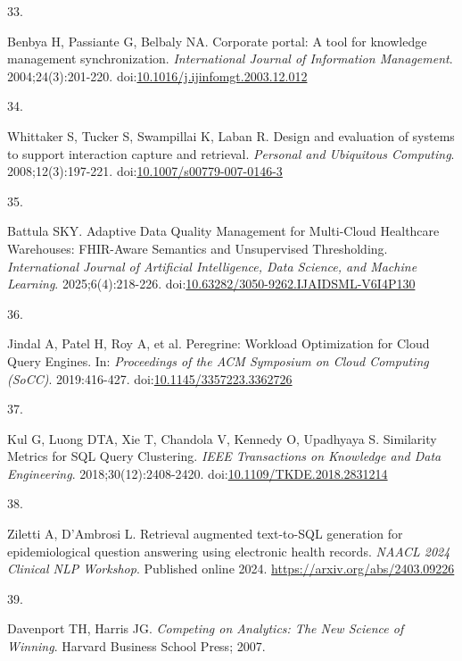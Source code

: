 \documentclass[
  american,
  11pt,
  letterpaper,
  oneside  ,captions=tableheading
]{scrartcl}
\newlength{\cslhangindent}
\newlength{\csllabelwidth}
\newenvironment{CSLReferences}[2] %
 {\begin{list}{}{%
  \setlength{\itemindent}{0pt}
  \setlength{\leftmargin}{0pt}
  \setlength{\parsep}{0pt}
  \ifodd #1
   \setlength{\leftmargin}{\cslhangindent}
   \setlength{\itemindent}{-1\cslhangindent}
  \fi
  \setlength{\itemsep}{#2\baselineskip}}}
 {\end{list}}
\newcommand{\CSLLeftMargin}[1]{\parbox[t]{\csllabelwidth}{\strut#1\strut}}
\newcommand{\CSLRightInline}[1]{\parbox[t]{\linewidth - \csllabelwidth}{\strut#1\strut}}
\begin{document}
\begin{CSLReferences}{0}{1}
\CSLLeftMargin{33. }%
\CSLRightInline{Benbya H, Passiante G, Belbaly NA. {Corporate portal: A
tool for knowledge management synchronization}. \emph{International
Journal of Information Management}. 2004;24(3):201-220.
doi:\href{https://doi.org/10.1016/j.ijinfomgt.2003.12.012}{10.1016/j.ijinfomgt.2003.12.012}}

\CSLLeftMargin{34. }%
\CSLRightInline{Whittaker S, Tucker S, Swampillai K, Laban R. Design and
evaluation of systems to support interaction capture and retrieval.
\emph{Personal and Ubiquitous Computing}. 2008;12(3):197-221.
doi:\href{https://doi.org/10.1007/s00779-007-0146-3}{10.1007/s00779-007-0146-3}}

\CSLLeftMargin{35. }%
\CSLRightInline{Battula SKY. {Adaptive Data Quality Management for
Multi-Cloud Healthcare Warehouses: FHIR-Aware Semantics and Unsupervised
Thresholding}. \emph{International Journal of Artificial Intelligence,
Data Science, and Machine Learning}. 2025;6(4):218-226.
doi:\href{https://doi.org/10.63282/3050-9262.IJAIDSML-V6I4P130}{10.63282/3050-9262.IJAIDSML-V6I4P130}}

\CSLLeftMargin{36. }%
\CSLRightInline{Jindal A, Patel H, Roy A, et al. {Peregrine: Workload
Optimization for Cloud Query Engines}. In: \emph{Proceedings of the ACM
Symposium on Cloud Computing (SoCC)}. 2019:416-427.
doi:\href{https://doi.org/10.1145/3357223.3362726}{10.1145/3357223.3362726}}

\CSLLeftMargin{37. }%
\CSLRightInline{Kul G, Luong DTA, Xie T, Chandola V, Kennedy O,
Upadhyaya S. {Similarity Metrics for SQL Query Clustering}. \emph{IEEE
Transactions on Knowledge and Data Engineering}. 2018;30(12):2408-2420.
doi:\href{https://doi.org/10.1109/TKDE.2018.2831214}{10.1109/TKDE.2018.2831214}}

\CSLLeftMargin{38. }%
\CSLRightInline{Ziletti A, D'Ambrosi L. {Retrieval augmented text-to-SQL
generation for epidemiological question answering using electronic
health records}. \emph{{NAACL} 2024 Clinical {NLP} Workshop}. Published
online 2024. \url{https://arxiv.org/abs/2403.09226}}

\CSLLeftMargin{39. }%
\CSLRightInline{Davenport TH, Harris JG. \emph{{Competing on Analytics:
The New Science of Winning}}. Harvard Business School Press; 2007.}


\end{CSLReferences}
\end{document}
